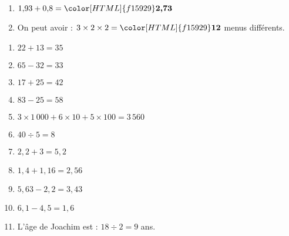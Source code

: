 \begin{Correction}
\begin{EXO}{}{}
\begin{enumerate}[itemsep=1em, label=\arabic*)]
\item $1{,}93+ 0{,}8={\color[HTML]{f15929}\boldsymbol{2{,}73}}$
\item On peut avoir : $3\times 2\times 2 ={\color[HTML]{f15929}\boldsymbol{12}}$ menus différents.
\end{enumerate}

\end{EXO}

\begin{EXO}{}{}
\begin{multicols}{2}

\begin{enumerate}[itemsep=1em, label=\arabic*)]
\item \begin{minipage}[t]{\linewidth}$22+13=35$\end{minipage}
\item \begin{minipage}[t]{\linewidth}$65-32=33$\end{minipage}
\item \begin{minipage}[t]{\linewidth}$17+25=42$\end{minipage}
\item \begin{minipage}[t]{\linewidth}$83-25=58$\end{minipage}
\item \begin{minipage}[t]{\linewidth}$3\times 1\,000 + 6\times 10 + 5\times 100 =3\,560$\end{minipage}
\item \begin{minipage}[t]{\linewidth}$40\div5=8$\end{minipage}
\item \begin{minipage}[t]{\linewidth}$2{,}2+3=5{,}2$\end{minipage}
\item \begin{minipage}[t]{\linewidth}$1{,}4+1{,}16=2{,}56$\end{minipage}
\item \begin{minipage}[t]{\linewidth}$5{,}63-2{,}2=3{,}43$\end{minipage}
\item \begin{minipage}[t]{\linewidth}$6{,}1-4{,}5=1{,}6$\end{minipage}
\item \begin{minipage}[t]{\linewidth}L'âge de Joachim est : $18 \div 2=9$ ans.\end{minipage}

\end{enumerate}
\end{multicols}
\end{EXO}
\end{Correction}
